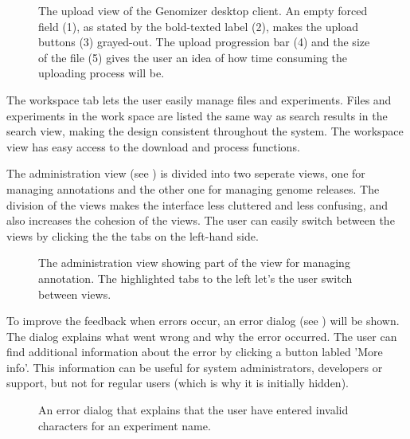 \begin{figure}[h!]
	\caption{The upload view of the Genomizer desktop client. An empty forced field (1), as stated by the bold-texted label (2), makes the upload buttons (3) grayed-out. The upload progression bar (4) and the size of the file (5) gives the user an idea of how time consuming the uploading process will be.}
	\label{fig:des_upload_view}
\end{figure}

The workspace tab lets the user easily manage files and experiments. Files and experiments in the work space are listed the same way as search results in the search view, making the design consistent throughout the system. The workspace view has easy access to the download and process functions.

The administration view (see ) is divided into two seperate views, one for managing annotations and the other one for managing genome releases. The division of the views makes the interface less cluttered and less confusing, and also increases the cohesion of the views. The user can easily switch between the views by clicking the the tabs on the left-hand side.

\begin{figure}[h]
	\caption{The administration view showing part of the view for managing annotation. The highlighted tabs to the left let's the user switch between views.}
	\label{fig:des_admin_view}
\end{figure}

To improve the feedback when errors occur, an error dialog (see ) will be shown. The dialog explains what went wrong and why the error occurred. The user can find additional information about the error by clicking a button labled 'More info'. This information can be useful for system administrators, developers or support, but not for regular users (which is why it is initially hidden).

\begin{figure}[h!]
	\caption{An error dialog that explains that the user have entered invalid characters for an experiment name.}
	\label{fig:des_error_dialog}
\end{figure}

\FloatBarrier

